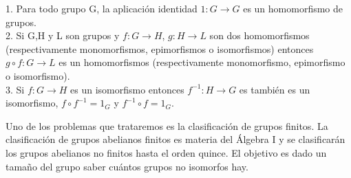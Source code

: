 \begin{proposition}
1. Para todo grupo G, la aplicación identidad $1:G \rightarrow G$ es un homomorfismo de grupos. \\
2. Si G,H y L son grupos y $f:G \rightarrow H$, $g:H \rightarrow L$ son dos homomorfismos (respectivamente monomorfismos, epimorfismos o isomorfismos) entonces $g \circ f:G \rightarrow L$ es un homomorfismos (respectivamente monomorfismo, epimorfismo o isomorfismo). \\
3. Si $f:G \rightarrow H$ es un isomorfismo entonces $f^{-1}:H \rightarrow G$ es también es un isomorfismo, $f \circ f^{-1} = 1_G$ y  $f^{-1} \circ f = 1_G$.
\end{proposition}

Uno de los problemas que trataremos es la clasificación de grupos finitos. La clasificación de grupos abelianos finitos es materia del Álgebra I y se clasificarán los grupos abelianos no finitos hasta el orden quince. El objetivo es dado un tamaño del grupo saber cuántos grupos no isomorfos hay.
